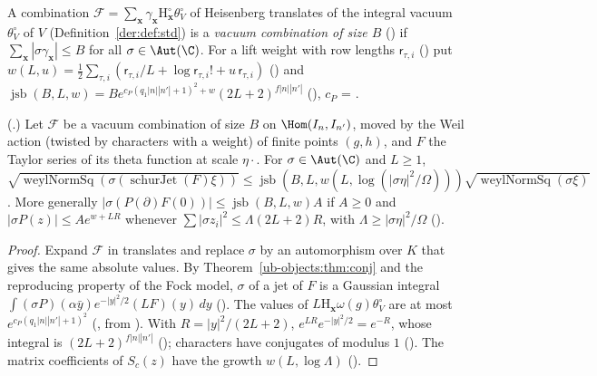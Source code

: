 A combination $\mathcal F=\sum_{\mathbf x}\gamma_{\mathbf x}\mathrm H^\circ_{\mathbf x}\theta^\circ_V$ of Heisenberg translates of the
integral vacuum $\theta^\circ_V$ of $V$ (Definition~\ref{der:def:std}) is a \emph{vacuum combination of size $B$} ()
if $\sum_{\mathbf x}|\sigma \gamma_{\mathbf x}|\le B$ for all $\sigma\in\Aut(\C)$. For a lift weight with row lengths
$\mathsf r_{\tau,i}$ () put $w(L,u)=\frac12\sum_{\tau,i}(\mathsf r_{\tau,i}/L+\log
\mathsf r_{\tau,i}!+u\,\mathsf r_{\tau,i})$ () and
$\operatorname{jsb}(B,L,w)=Be^{c_P(q_1|n||n'|+1)^2+w}(2L+2)^{f|n||n'|}$
(), $c_P$ = .

\begin{proposition}\label{ub-objects:prop:arch}
(.) Let $\mathcal F$ be a vacuum combination of size $B$ on $\Hom(I_n,I_{n'})$, moved by the Weil action (twisted
by characters with a weight) of finite points $(g,h)$, and $F$ the Taylor series of its theta
function at scale $\eta\cdot$. For $\sigma\in\Aut(\C)$ and $L\ge1$,
$\sqrt{\operatorname{weylNormSq}(\sigma(\operatorname{schurJet}(F)\xi))}\le
\operatorname{jsb}(B,L,w(L,\log(|\sigma\eta|^2/\Omega)))\sqrt{\operatorname{weylNormSq}(\sigma\xi)}$.
More generally $|\sigma(P(\partial)F(0))|\le\operatorname{jsb}(B,L,w)A$ if $A\ge0$ and $|\sigma P(z)|\le
Ae^{w+LR}$ whenever $\sum|\sigma z_i|^2\le \Lambda(2L+2)R$, with $\Lambda\ge|\sigma\eta|^2/\Omega$
().
\end{proposition}

\begin{proof}
Expand $\mathcal F$ in translates and replace $\sigma$ by an automorphism over $K$ that gives the same
absolute values. By Theorem~\ref{ub-objects:thm:conj} and the reproducing property of the Fock model, $\sigma$ of a
jet of $F$ is a Gaussian integral $\int(\sigma P)(\alpha\bar y)e^{-|y|^2/2}(LF)(y)\,dy$
(). The values of $L\mathrm H_{\mathbf x}\omega(g)\theta^\circ_V$
are at most $e^{c_P(q_1|n||n'|+1)^2}$ (,
from ). With $R=|y|^2/(2L+2)$, $e^{LR}e^{-|y|^2/2}=e^{-R}$,
whose integral is $(2L+2)^{f|n||n'|}$ (); characters
have conjugates of modulus $1$ (). The matrix coefficients of
$S_c(z)$ have the growth $w(L,\log \Lambda)$ ().
\end{proof}


